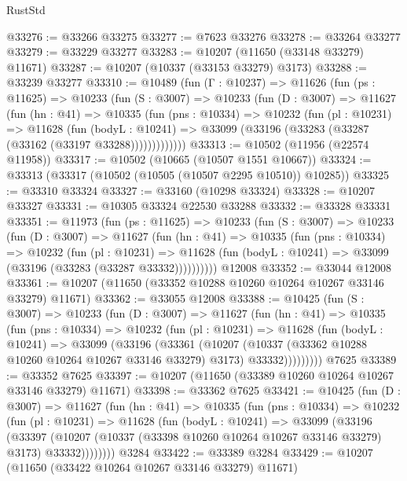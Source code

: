 \begin{lexlean}{RustStd}
\begin{coremodule}
@33276 := @33266 @33275
@33277 := @7623 @33276
@33278 := @33264 @33277
@33279 := @33229 @33277
@33283 := @10207 (@11650 (@33148 @33279) @11671)
@33287 := @10207 (@10337 (@33153 @33279) @3173)
@33288 := @33239 @33277
@33310 := @10489
    (fun (Γ : @10237) =>
    @11626
      (fun (ps : @11625) =>
      @10233
        (fun (S : @3007) =>
        @10233
          (fun (D : @3007) =>
          @11627
            (fun (hn : @41) =>
            @10335
              (fun (pns : @10334) =>
              @10232
                (fun (pl : @10231) =>
                @11628
                  (fun (bodyL : @10241) =>
                  @33099 (@33196 (@33283 (@33287 (@33162 (@33197 @33288)))))))))))))
@33313 := @10502 (@11956 (@22574 @11958))
@33317 := @10502 (@10665 (@10507 @1551 @10667))
@33324 := @33313 (@33317 (@10502 (@10505 (@10507 @2295 @10510)) @10285))
@33325 := @33310 @33324
@33327 := @33160 (@10298 @33324)
@33328 := @10207 @33327
@33331 := @10305 @33324 @22530 @33288
@33332 := @33328 @33331
@33351 := @11973
    (fun (ps : @11625) =>
    @10233
      (fun (S : @3007) =>
      @10233
        (fun (D : @3007) =>
        @11627
          (fun (hn : @41) =>
          @10335
            (fun (pns : @10334) =>
            @10232
              (fun (pl : @10231) =>
              @11628 (fun (bodyL : @10241) => @33099 (@33196 (@33283 (@33287 @33332))))))))))
    @12008
@33352 := @33044 @12008
@33361 := @10207 (@11650 (@33352 @10288 @10260 @10264 @10267 @33146 @33279) @11671)
@33362 := @33055 @12008
@33388 := @10425
    (fun (S : @3007) =>
    @10233
      (fun (D : @3007) =>
      @11627
        (fun (hn : @41) =>
        @10335
          (fun (pns : @10334) =>
          @10232
            (fun (pl : @10231) =>
            @11628
              (fun (bodyL : @10241) =>
              @33099
                (@33196
                  (@33361
                    (@10207
                      (@10337 (@33362 @10288 @10260 @10264 @10267 @33146 @33279) @3173)
                      @33332)))))))))
    @7625
@33389 := @33352 @7625
@33397 := @10207 (@11650 (@33389 @10260 @10264 @10267 @33146 @33279) @11671)
@33398 := @33362 @7625
@33421 := @10425
    (fun (D : @3007) =>
    @11627
      (fun (hn : @41) =>
      @10335
        (fun (pns : @10334) =>
        @10232
          (fun (pl : @10231) =>
          @11628
            (fun (bodyL : @10241) =>
            @33099
              (@33196
                (@33397
                  (@10207 (@10337 (@33398 @10260 @10264 @10267 @33146 @33279) @3173) @33332))))))))
    @3284
@33422 := @33389 @3284
@33429 := @10207 (@11650 (@33422 @10264 @10267 @33146 @33279) @11671)

\end{coremodule}
\end{lexlean}
